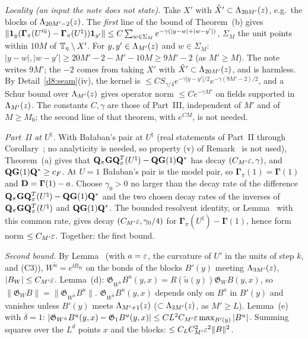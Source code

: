\begin{detail}
\begin{step}
\emph{Locality (an input the note does not state).} Take $X'$ with $\hat X'\subset\Lambda_{20M'}(z)$, e.g.\ the blocks of $\Lambda_{20M'-2}(z)$. The \emph{first} line of the bound of Theorem~(b) gives $\|\mathbf 1_y(\boldsymbol\Gamma_\pi(U'^{\tilde u})-\boldsymbol\Gamma_\pi(U^\natural))\mathbf 1_{y'}\|\le C\sum_{w\in\Sigma_M}e^{-\gamma(|y-w|+|w-y'|)}$, $\Sigma_M$ the unit points within $10M$ of $\mathbb T_\eta\setminus X'$. For $y,y'\in\Lambda_{M'}(z)$ and $w\in\Sigma_M$: $|y-w|,|w-y'|\ge20M'-2-M'-10M\ge9M'-2$ (as $M'\ge M$). The note writes $9M'$; the $-2$ comes from taking $X'$ with $\hat X'\subset\Lambda_{20M'}(z)$, and is harmless. By Detail~\ref{d8:seam}(iv), the kernel is $\le CS_{\gamma/4}e^{-\gamma|y-y'|/2}e^{-\gamma(9M'-2)/2}$, and a Schur bound over $\Lambda_{M'}(z)$ gives operator norm $\le Ce^{-\gamma M'}$ on fields supported in $\Lambda_{M'}(z)$. The constants $C,\gamma$ are those of Part~III, independent of $M'$ and of $M\ge M_0$; the second line of that theorem, with $e^{CM}$, is not needed.
\end{step}
\begin{step}
\emph{Part~II at $U^\natural$.} With Ba\l aban's pair at $U^\natural$ (real statements of Part~II through Corollary~; no analyticity is needed, so property (v) of Remark~ is not used), Theorem~(a) gives that $\mathbf Q_\pi\mathbf G\mathbf Q_\pi^T(U^\natural)-\mathbf Q\mathbf G(1)\mathbf Q^*$ has decay $(C_{M'}\varepsilon,\gamma)$, and $\mathbf Q\mathbf G(1)\mathbf Q^*\ge c_F$. At $U=1$ Ba\l aban's pair is the model pair, so $\boldsymbol\Gamma_\pi(1)=\boldsymbol\Gamma(1)$ and $\mathbf D=\boldsymbol\Gamma(1)-a$. Choose $\gamma_0>0$ no larger than the decay rate of the difference $\mathbf Q_\pi\mathbf G\mathbf Q_\pi^T(U^\natural)-\mathbf Q\mathbf G(1)\mathbf Q^*$ and the two chosen decay rates of the inverses of $\mathbf Q_\pi\mathbf G\mathbf Q_\pi^T(U^\natural)$ and $\mathbf Q\mathbf G(1)\mathbf Q^*$. The bounded resolvent identity, or Lemma~ with this common rate, gives decay $(C_{M'}\varepsilon,\gamma_0/4)$ for $\boldsymbol\Gamma_\pi(U^\natural)-\boldsymbol\Gamma(1)$, hence form norm $\le C_{M'}\varepsilon$. Together: the first bound.
\end{step}
\begin{step}
\emph{Second bound.} By Lemma~ (with $a=\varepsilon$, the curvature of $U'$ in the units of step $k$, and (C3)), $W^{\tilde u}=e^{\ii B_W}$ on the bonds of the blocks $B'(y)$ meeting $\Lambda_{3M'}(z)$, $|B_W|\le C_{M'}\varepsilon$. Lemma~(d): $\mathfrak G_{W^{\tilde u}}B^u(y,x)=R(\tilde u(y))\mathfrak G_WB(y,x)$, so $\|\mathfrak G_WB\|=\|\mathfrak G_{W^{\tilde u}}B^u\|$. $\mathfrak G_{W^{\tilde u}}B^u(y,x)$ depends only on $B^u$ in $B'(y)$ and vanishes unless $B'(y)$ meets $\Lambda_{M'+1}(z)$ ($\subset\Lambda_{3M'}(z)$, as $M'\ge L$). Lemma~(e) with $\delta=1$: $|\mathfrak G_{W^{\tilde u}}B^u(y,x)-\mathfrak G_1B^u(y,x)|\le CL^2C_{M'}\varepsilon\max_{B'(y)}|B^u|$. Summing squares over the $L^d$ points $x$ and the blocks: $\le C_LC_{M'}^2\varepsilon^2\|B\|^2$.

\end{step}
\end{detail}
